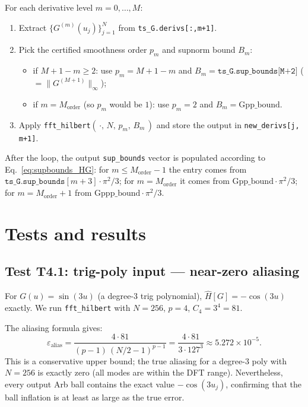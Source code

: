 \documentclass[11pt]{article}
\theoremstyle{definition}
\begin{document}
For each derivative level $m = 0,\ldots,M$:
\begin{enumerate}
  \item Extract $\{G^{(m)}(u_j)\}_{j=1}^N$ from \texttt{ts\_G.derivs[:,m+1]}.
  \item Pick the certified smoothness order $p_m$ and supnorm bound $B_m$:
        \begin{itemize}
          \item if $M+1-m \ge 2$: use $p_m = M+1-m$ and
                $B_m = \texttt{ts\_G.sup\_bounds[M+2]}$ ($= \|G^{(M+1)}\|_\infty$);
          \item if $m = M_{\mathrm{order}}$ (so $p_m$ would be $1$):
                use $p_m = 2$ and $B_m = \mathrm{Gpp\_bound}$.
        \end{itemize}
  \item Apply \texttt{fft\_hilbert}$(\,\cdot,\,N,\,p_m,\,B_m\,)$ and store the
        output in \texttt{new\_derivs[j, m+1]}.
\end{enumerate}
After the loop, the output \texttt{sup\_bounds} vector is populated according
to Eq.~\eqref{eq:supbounds_HG}: for $m \le M_{\mathrm{order}}-1$ the entry comes
from $\texttt{ts\_G.sup\_bounds}[m+3]\cdot \pi^2/3$; for $m = M_{\mathrm{order}}$
it comes from $\mathrm{Gpp\_bound}\cdot \pi^2/3$; for $m = M_{\mathrm{order}}+1$
from $\mathrm{Gppp\_bound}\cdot \pi^2/3$.

\section{Tests and results}

\subsection{Test T4.1: trig-poly input — near-zero aliasing}

For $G(u) = \sin(3u)$ (a degree-3 trig polynomial), $\hat H[G] = -\cos(3u)$ exactly.
We run \texttt{fft\_hilbert} with $N = 256$, $p = 4$, $C_4 = 3^4 = 81$.

The aliasing formula gives:
\[
  \varepsilon_{\mathrm{alias}} = \frac{4 \cdot 81}{(p-1)\,(N/2 - 1)^{p-1}}
  = \frac{4 \cdot 81}{3 \cdot 127^3}
  \approx 5.272 \times 10^{-5}.
\]
This is a conservative upper bound; the true aliasing for a degree-3 poly with $N=256$
is exactly zero (all modes are within the DFT range).  Nevertheless, every output
Arb ball contains the exact value $-\cos(3u_j)$, confirming that the ball inflation
is at least as large as the true error.
\end{document}
